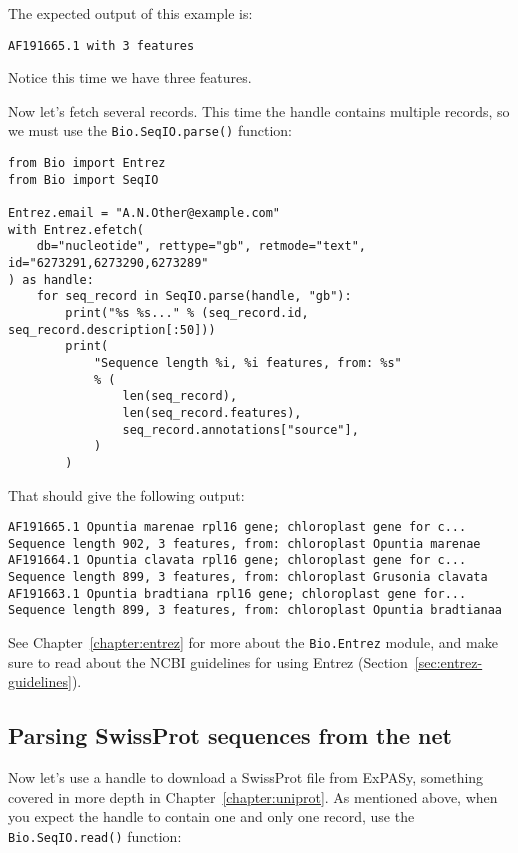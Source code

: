 \noindent The expected output of this example is:

\begin{verbatim}
AF191665.1 with 3 features
\end{verbatim}

\noindent Notice this time we have three features.

Now let's fetch several records.  This time the handle contains multiple records,
so we must use the \verb|Bio.SeqIO.parse()| function:

\begin{verbatim}
from Bio import Entrez
from Bio import SeqIO

Entrez.email = "A.N.Other@example.com"
with Entrez.efetch(
    db="nucleotide", rettype="gb", retmode="text", id="6273291,6273290,6273289"
) as handle:
    for seq_record in SeqIO.parse(handle, "gb"):
        print("%s %s..." % (seq_record.id, seq_record.description[:50]))
        print(
            "Sequence length %i, %i features, from: %s"
            % (
                len(seq_record),
                len(seq_record.features),
                seq_record.annotations["source"],
            )
        )
\end{verbatim}

\noindent That should give the following output:

\begin{verbatim}
AF191665.1 Opuntia marenae rpl16 gene; chloroplast gene for c...
Sequence length 902, 3 features, from: chloroplast Opuntia marenae
AF191664.1 Opuntia clavata rpl16 gene; chloroplast gene for c...
Sequence length 899, 3 features, from: chloroplast Grusonia clavata
AF191663.1 Opuntia bradtiana rpl16 gene; chloroplast gene for...
Sequence length 899, 3 features, from: chloroplast Opuntia bradtianaa
\end{verbatim}

See Chapter~\ref{chapter:entrez} for more about the \verb|Bio.Entrez| module, and make sure to read about the NCBI guidelines for using Entrez (Section~\ref{sec:entrez-guidelines}).

\subsection{Parsing SwissProt sequences from the net}
\label{sec:SeqIO_ExPASy_and_SwissProt}
Now let's use a handle to download a SwissProt file from ExPASy,
something covered in more depth in Chapter~\ref{chapter:uniprot}.
As mentioned above, when you expect the handle to contain one and only one record,
use the \verb|Bio.SeqIO.read()| function:

